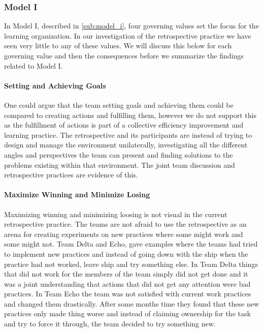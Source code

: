 \subsubsection{Model I}
In Model I, described in \autoref{sub:model_i}, four governing values set the focus for the learning organization. In our investigation of the retrospective practice we have seen very little to any of these values. We will discuss this below for each governing value and then the consequences before we summarize the findings related to Model I.  

\paragraph{Setting and  Achieving Goals}
One could argue that the team setting goals and achieving them could be compared to creating actions and fulfilling them, however we do not support this as the fulfillment of actions is part of a collective efficiency improvement and learning practice. The retrospective and its participants are instead of trying to design and manage the environment unilaterally, investigating all the different angles and perspectives the team can present and finding solutions to the problems existing within that environment. The joint team discussion and retrospective practices are evidence of this. 

\paragraph{Maximize Winning and Minimize Losing}
Maximizing winning and minimizing loosing is not visual in the current retrospective practice. The teams are not afraid to use the retrospective as an arena for creating experiments on new practices where some might work and some might not. Team Delta and Echo, gave examples where the teams had tried to implement new practices and instead of going down with the ship when the practice had not worked, leave ship and try something else. In Team Delta things that did not work for the members of the team simply did not get done and it was a joint understanding that actions that did not get any attention were bad practices. In Team Echo the team was not satisfied with current work practices and changed them drastically. After some months time they found that these new practices only made thing worse and instead of claiming ownership for the task and try to force it through, the team decided to try something new. 

